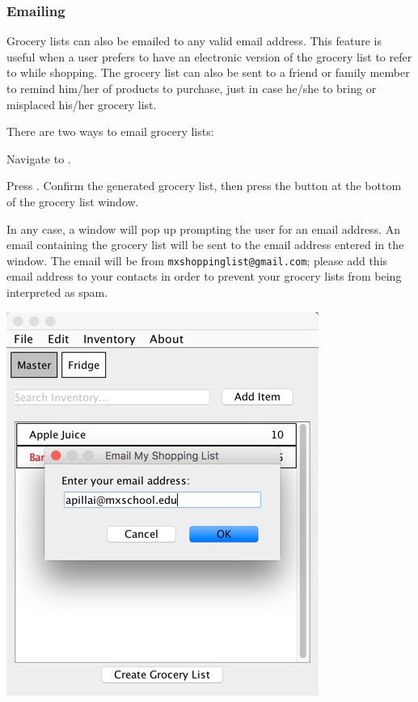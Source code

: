 \documentclass[letterpaper,12pt]{article}
\renewenvironment{enumerate}[1]{\begin{compactenum}#1}{\end{compactenum}}
\begin{document}
		
		\subsubsection{Emailing}
Grocery lists can also be emailed to any valid email address. This feature is useful when a user prefers to have an electronic version of the grocery list to refer to while shopping. The grocery list can also be sent to a friend or family member to remind him/her of products to purchase, just in case he/she to bring or misplaced his/her grocery list. 

There are two ways to email grocery lists:

\begin{enumerate}
\item Navigate to . 
\item Press . Confirm the generated grocery list, then press the  button at the bottom of the grocery list window.
\end{enumerate}

In any case, a window will pop up prompting the user for an email address. An email containing the grocery list will be sent to the email address entered in the window. The email will be from \verb|mxshoppinglist@gmail.com|; please add this email address to your contacts in order to prevent your grocery lists from being interpreted as spam.\\

	\centerline{\includegraphics[scale=0.5]{19.png}}
\end{document}

